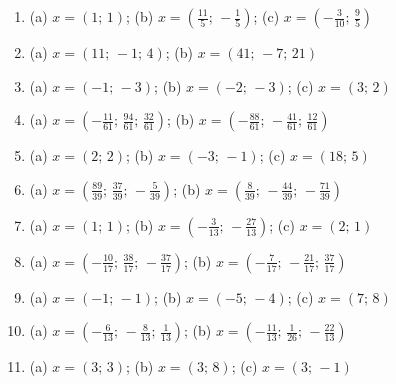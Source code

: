 \begin{enumerate}[label=\arabic*., leftmargin=*, itemsep=1pt]
\item (a) $x=(1;\,1)$; (b) $x=(\frac{11}{5};\,-\frac{1}{5})$; (c) $x=(-\frac{3}{10};\,\frac{9}{5})$
\item (a) $x=(11;\,-1;\,4)$; (b) $x=(41;\,-7;\,21)$
\item (a) $x=(-1;\,-3)$; (b) $x=(-2;\,-3)$; (c) $x=(3;\,2)$
\item (a) $x=(-\frac{11}{61};\,\frac{94}{61};\,\frac{32}{61})$; (b) $x=(-\frac{88}{61};\,-\frac{41}{61};\,\frac{12}{61})$
\item (a) $x=(2;\,2)$; (b) $x=(-3;\,-1)$; (c) $x=(18;\,5)$
\item (a) $x=(\frac{89}{39};\,\frac{37}{39};\,-\frac{5}{39})$; (b) $x=(\frac{8}{39};\,-\frac{44}{39};\,-\frac{71}{39})$
\item (a) $x=(1;\,1)$; (b) $x=(-\frac{3}{13};\,-\frac{27}{13})$; (c) $x=(2;\,1)$
\item (a) $x=(-\frac{10}{17};\,\frac{38}{17};\,-\frac{37}{17})$; (b) $x=(-\frac{7}{17};\,-\frac{21}{17};\,\frac{37}{17})$
\item (a) $x=(-1;\,-1)$; (b) $x=(-5;\,-4)$; (c) $x=(7;\,8)$
\item (a) $x=(-\frac{6}{13};\,-\frac{8}{13};\,\frac{1}{13})$; (b) $x=(-\frac{11}{13};\,\frac{1}{26};\,-\frac{22}{13})$
\item (a) $x=(3;\,3)$; (b) $x=(3;\,8)$; (c) $x=(3;\,-1)$
\end{enumerate}

